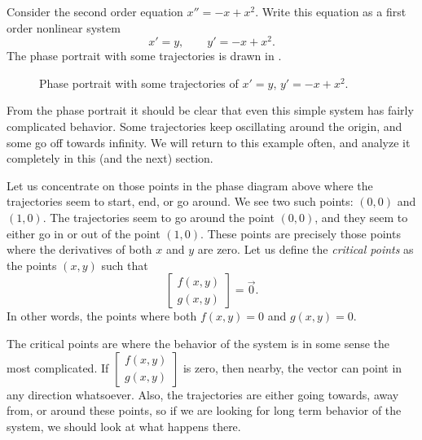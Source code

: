 \documentclass[12pt]{book}
\begin{document}
\begin{example} \label{example:nlin-1b-example}
Consider the second order equation $x''=-x+x^2$.
Write this equation as a first order nonlinear system
\begin{equation*}
x' = y , \qquad y' = -x+x^2 .
\end{equation*}
The phase portrait with some trajectories is drawn in
.
\begin{figure}[h!t]
\capstart
\begin{center}
\caption{Phase portrait with some trajectories of
$x' = y$, $y' = -x+x^2$. \label{fig:nlin-1b}}
\end{center}
\end{figure}

From the phase portrait it should be clear that even this simple system has
fairly complicated behavior.  Some trajectories keep oscillating around the
origin, and some go off towards infinity.  We will return to this example
often, and analyze it completely in this (and the next) section.
\end{example}

Let us concentrate on those points in the phase diagram
above where the trajectories
seem to start, end, or go around.  We see two such points:
$(0,0)$ and $(1,0)$.  The trajectories seem to go around the point $(0,0)$,
and they seem to either go in or out of the point $(1,0)$.
%
These points are precisely those points where the derivatives of both $x$
and $y$ are zero.  Let us define the \emph{critical points}
as the points $(x,y)$ such that
\begin{equation*} 
\begin{bmatrix} f(x,y) \\ g(x,y) \end{bmatrix} = \vec{0} .
\end{equation*}
In other words, the points where both $f(x,y)=0$ and $g(x,y)=0$.

The critical points are where the behavior of the system is
in some sense the most complicated.  If
$\left[ \begin{smallmatrix} f(x,y) \\ g(x,y) \end{smallmatrix} \right]$
is zero, then nearby, the vector can point in any direction whatsoever.
Also, the trajectories are either going towards, away from, or around these
points, so if we are looking for long term behavior of the system, we
should look at what happens there.
\end{document}

